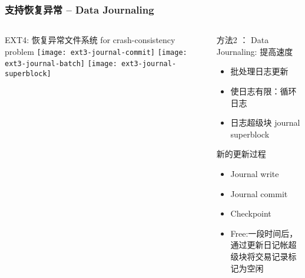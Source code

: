 \begin{frame}[fragile]
	\frametitle{支持恢复异常 -- Data Journaling}
	\begin{columns}
		\begin{column}{.5\textwidth}
			EXT4: 恢复异常文件系统 for crash-consistency problem
			\texttt{[image: ext3-journal-commit]}
			\texttt{[image: ext3-journal-batch]}
			\texttt{[image: ext3-journal-superblock]}
		\end{column}
		\begin{column}{.5\textwidth}			
			方法2 ： Data Journaling: 提高速度
			\begin{itemize}
				\item  批处理日志更新
				\item  使日志有限：循环日志
				\item 日志超级块 journal	superblock
			\end{itemize}
			\pause
			新的更新过程
			\begin{itemize}	
				\item Journal write
				\item Journal commit
				\item Checkpoint
				\item Free:一段时间后，通过更新日记帐超级块将交易记录标记为空闲
				
			\end{itemize}

		\end{column}
	\end{columns}
	
\end{frame}



